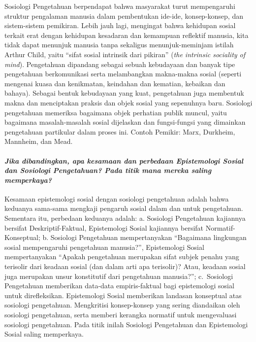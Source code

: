 \documentclass[10pt,a4paper]{article}
\begin{document}
\begin{multicols}{2}
Sosiologi Pengetahuan berpendapat bahwa masyarakat turut mempengaruhi
struktur pengalaman manusia dalam pembentukan ide-ide, konsep-konsep,
dan sistem-sistem pemikiran. Lebih jauh lagi, mengingat bahwa kehidupan
sosial terkait erat dengan kehidupan kesadaran dan kemampuan reflektif
manusia, kita tidak dapat menunjuk manusia tanpa sekaligus
menunjuk-meminjam istilah Arthur Child, yaitu ``sifat sosial intrinsik
dari pikiran'' (\emph{the intrinsic sociality of mind}). Pengetahuan
dipandang sebagai sebuah kebudayaan dan banyak tipe pengetahuan
berkomunikasi serta melambangkan makna-makna sosial (seperti mengenai
kuasa dan kenikmatan, keindahan dan kematian, kebaikan dan bahaya).
Sebagai bentuk kebudayaan yang kuat, pengetahuan juga membentuk makna
dan menciptakan praksis dan objek sosial yang sepenuhnya baru. Sosiologi
pengetahuan memeriksa bagaimana objek perhatian publik muncul, yaitu
bagaimana masalah-masalah sosial dijelaskan dan fungsi-fungsi yang
dimainkan pengetahuan partikular dalam proses ini. Contoh Pemikir: Marx,
Durkheim, Mannheim, dan Mead.

\hypertarget{jika-dibandingkan-apa-kesamaan-dan-perbedaan-epistemologi-sosial-dan-sosiologi-pengetahuan-pada-titik-mana-mereka-saling-memperkaya}{%
\paragraph{\texorpdfstring{\emph{Jika dibandingkan, apa kesamaan dan
perbedaan Epistemologi Sosial dan Sosiologi Pengetahuan? Pada titik mana
mereka saling
memperkaya?}}{Jika dibandingkan, apa kesamaan dan perbedaan Epistemologi Sosial dan Sosiologi Pengetahuan? Pada titik mana mereka saling memperkaya?}}\label{jika-dibandingkan-apa-kesamaan-dan-perbedaan-epistemologi-sosial-dan-sosiologi-pengetahuan-pada-titik-mana-mereka-saling-memperkaya}}

Kesamaan epistemologi sosial dengan sosiologi pengetahuan adalah bahwa
keduanya sama-sama mengkaji pengaruh sosial dalam dan untuk pengetahuan.
Sementara itu, perbedaan keduanya adalah: a. Sosiologi Pengetahuan
kajiannya bersifat Deskriptif-Faktual, Epistemologi Sosial kajiannya
bersifat Normatif-Konseptual; b. Sosiologi Pengetahuan mempertanyakan
``Bagaimana lingkungan sosial mempengaruhi pengetahuan manusia?'',
Epistemologi Sosial mempertanyakan ``Apakah pengetahuan merupakan sifat
subjek penahu yang terisolir dari keadaan sosial (dan dalam arti apa
terisolir)? Atau, keadaan sosial juga merupakan unsur konstitutif dari
pengetahuan manusia?''; c.~Sosiologi Pengetahuan memberikan data-data
empiris-faktual bagi epistemologi sosial untuk direfleksikan.
Epistemologi Sosial memberikan landasan konseptual atas sosiologi
pengetahuan. Mengkritisi konsep-konsep yang sering diandaikan oleh
sosiologi pengetahuan, serta memberi kerangka normatif untuk
mengevaluasi sosiologi pengetahuan. Pada titik inilah Sosiologi
Pengetahuan dan Epistemologi Sosial saling memperkaya.


\end{multicols}
\end{document}
